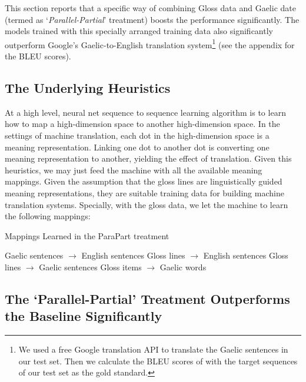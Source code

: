 \documentclass[11pt,a4paper]{article}
\begin{document}
This section reports that a specific way of combining Gloss data and Gaelic date (termed as `\textit{Parallel-Partial}' treatment) boosts the performance significantly. The models trained with this specially arranged training data also significantly outperform Google's Gaelic-to-English translation system\footnote{ We used a free Google translation API \citep{google_api} to translate the Gaelic sentences in our test set. Then we calculate the BLEU scores of with the target sequences of our test set as the gold standard.} (see the appendix for the BLEU scores).

\subsection{The Underlying Heuristics}\label{heuristics}
At a high level, neural net sequence to sequence learning algorithm is to learn how to map a high-dimension space to another high-dimension space. In the settings of machine translation, each dot in the high-dimension space is a meaning representation. Linking one dot to another dot is converting one meaning representation to another, yielding the effect of translation. Given this heuristics, we may just feed the machine with all the available meaning mappings. Given the assumption that the gloss lines are linguistically guided meaning representations, they are suitable training data for building machine translation systems. Specially, with the gloss data, we let the machine to learn the following mappings:

\begin{exe}
	\ex Mappings Learned in the ParaPart treatment
	\begin{xlist}
		\ex Gaelic sentences $\rightarrow$ English sentences
		\ex Gloss lines $\rightarrow$ English sentences
		\ex Gloss lines $\rightarrow$ Gaelic sentences
		\ex Gloss items $\rightarrow$ Gaelic words
	\end{xlist}	
\end{exe}    

\subsection{The `Parallel-Partial' Treatment Outperforms the Baseline Significantly}\label{sec:ParaPart}
\end{document}
